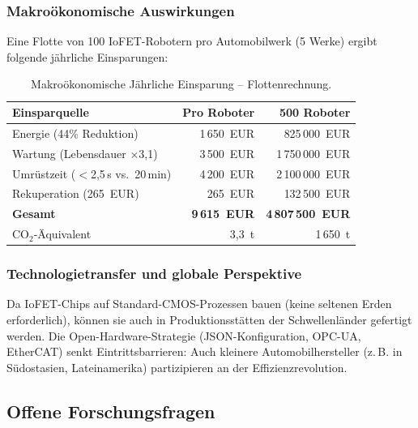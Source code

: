 ﻿\documentclass[a4paper,12pt]{scrreprt}
\theoremstyle{definition}
\begin{document}
\subsubsection{Makroökonomische Auswirkungen}

Eine Flotte von 100 IoFET-Robotern pro Automobilwerk (5 Werke)
ergibt folgende jährliche Einsparungen:

\begin{table}[H]
\centering
\caption{Makroökonomische Jährliche Einsparung -- Flottenrechnung.}
\label{tab:makroe}
\small
\begin{tabular}{|l|r|r|}
\hline
\rowcolor{fpgagreen!20}
\textbf{Einsparquelle} & \textbf{Pro Roboter} & \textbf{500 Roboter} \\
\hline
Energie (44\% Reduktion) & 1\,650~EUR & 825\,000~EUR \\
\hline
Wartung (Lebensdauer $\times$3,1) & 3\,500~EUR & 1\,750\,000~EUR \\
\hline
Umrüstzeit ($<$2,5\,s vs.\ 20\,min) & 4\,200~EUR & 2\,100\,000~EUR \\
\hline
Rekuperation (265~EUR) & 265~EUR & 132\,500~EUR \\
\hline
\textbf{Gesamt} & \textbf{9\,615~EUR} & \textbf{4\,807\,500~EUR} \\
\hline
CO$_2$-Äquivalent & 3,3~t & 1\,650~t \\
\hline
\end{tabular}
\end{table}

\subsubsection{Technologietransfer und globale Perspektive}

Da IoFET-Chips auf Standard-CMOS-Prozessen bauen (keine seltenen
Erden erforderlich), können sie auch in Produktionsstätten
der Schwellenländer gefertigt werden. Die Open-Hardware-Strategie
(JSON-Konfiguration, OPC-UA, EtherCAT) senkt Eintrittsbarrieren:
Auch kleinere Automobilhersteller (z.\,B. in Südostasien, Lateinamerika)
partizipieren an der Effizienzrevolution.

\subsection{Offene Forschungsfragen}
\end{document}
